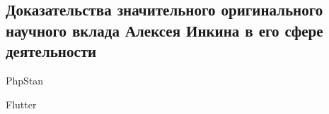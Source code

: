 \subsection{%
    Доказательства значительного оригинального научного вклада Алексея Инкина
    в его сфере деятельности%
}
\label{subsec:Contributions}

{PhpStan}

\pagebreak

{Flutter}

\pagebreak
